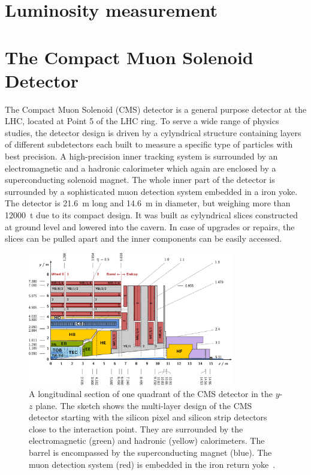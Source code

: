 \section{Luminosity measurement}

\section{The Compact Muon Solenoid Detector}

The Compact Muon Solenoid (CMS) detector is a general purpose detector at the
LHC, located at Point 5 of the LHC ring. To serve a wide range of physics
studies, the detector design is driven by a cylyndrical structure containing
layers of different subdetectors each built to measure a specific type of
particles with best precision. A high-precision inner tracking system is
surrounded by an electromagnetic and a hadronic calorimeter which again are
enclosed by a superconducting solenoid magnet. The whole inner part of the
detector is surrounded by a sophisticated muon detection system embedded in a
iron yoke. The detector is \SI{21.6}{\meter} long and \SI{14.6}{\meter} in
diameter, but weighing more than \SI{12000}{\tonne} due to its compact design.
It was built as cylyndrical slices constructed at ground level and lowered into
the cavern. In case of upgrades or repairs, the slices can be pulled apart and
the inner components can be easily accessed.

\begin{figure}[htp]
    \centering
    \includegraphics[width=0.8\textwidth]{figures/cms_detector/cms_longitudinal_section.pdf}
    \caption[Longitudinal section of the CMS
    detector]{A longitudinal section of one quadrant of the CMS
        detector in the $y$-$z$ plane. The sketch shows
    the multi-layer design of the CMS detector starting with the silicon pixel
and silicon strip detectors close to the interaction point. They are surrounded
by the electromagnetic (green) and hadronic (yellow) calorimeters. The barrel is
encompassed by the superconducting magnet (blue). The muon detection system
(red) is embedded in the iron return yoke~\cite{Berger:2014aca}.}
    \label{fig:cms:longitudinal_section}
\end{figure}

